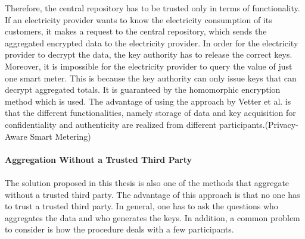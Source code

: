 Therefore, the central repository has to be trusted only in terms of functionality. If an electricity provider wants to know the electricity consumption of its customers, it makes a request to the central repository, which sends the aggregated encrypted data to the electricity provider. In order for the electricity provider to decrypt the data, the key authority has to release the correct keys. Moreover, it is impossible for the electricity provider to query the value of just one smart meter. This is because the key authority can only issue keys that can decrypt aggregated totals. It is guaranteed by the homomorphic encryption method which is used. The advantage of using the approach by Vetter et al. is that the different functionalities, namely storage of data and key acquisition for confidentiality and authenticity are realized from different participants.(Privacy-Aware Smart Metering)
\\
\\
\textbf{Aggregation Without a Trusted Third Party}
\\
\\
The solution proposed in this thesis is also one of the methods that aggregate without a trusted third party. The advantage of this approach is that no one has to trust a trusted third party. In general, one has to ask the questions who aggregates the data and who generates the keys. In addition, a common problem to consider is how the procedure deals with a few participants. \\
